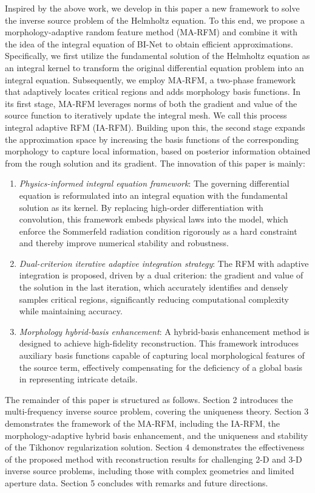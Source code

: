 \documentclass{article}
\theoremstyle{plain}
\theoremstyle{definition}
\begin{document}
Inspired by the above work, we develop in this paper a new framework to solve the inverse source problem of the Helmholtz equation. To this end, we propose a morphology-adaptive random feature method (MA-RFM) and combine it with the idea of the integral equation of BI-Net to obtain efficient approximations. Specifically, we first utilize the fundamental solution of the Helmholtz equation as an integral kernel to transform the original differential equation problem into an integral equation. Subsequently, we employ MA-RFM, a two-phase framework that adaptively locates critical regions and adds morphology basis functions. In its first stage, MA-RFM leverages norms of both the gradient and value of the source function to iteratively update the integral mesh. We call this process integral adaptive RFM (IA-RFM). Building upon this, the second stage expands the approximation space by increasing the basis functions of the corresponding morphology to capture local information, based on posterior information obtained from the rough solution and its gradient.
The innovation of this paper is mainly: 
\begin{enumerate}
\item \emph{Physics-informed integral equation framework}:  The governing differential equation is reformulated into an integral equation with the fundamental solution as its kernel. By replacing high-order differentiation with convolution, this framework embeds physical laws into the model, which enforce the Sommerfeld radiation condition rigorously as a hard constraint and thereby improve numerical stability and robustness.
\item \emph{Dual-criterion iterative adaptive integration strategy}: The RFM with adaptive integration is proposed, driven by a dual criterion: the gradient and value of the solution in the last iteration, which accurately identifies and densely samples critical regions,  significantly reducing computational complexity while maintaining accuracy.
\item \emph{Morphology hybrid-basis enhancement}:  A hybrid-basis enhancement method is designed to achieve high-fidelity reconstruction. This framework introduces auxiliary basis functions capable of capturing local morphological features of the source term, effectively compensating for the deficiency of a global basis in representing intricate details.
\end{enumerate}
The remainder of this paper is structured as follows. Section 2 introduces the multi-frequency inverse source problem, covering the uniqueness theory. Section 3 demonstrates the framework of the MA-RFM, including the IA-RFM, the morphology-adaptive hybrid basis enhancement, and the uniqueness and stability of the Tikhonov regularization solution. Section 4 demonstrates the effectiveness of the proposed method with reconstruction results for challenging 2-D and 3-D inverse source problems, including those with complex geometries and limited aperture data. Section 5 concludes with remarks and future directions.
\end{document}
